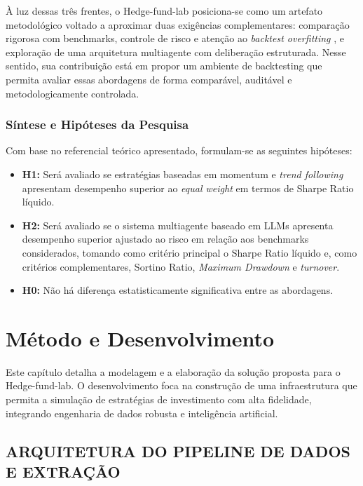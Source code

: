 \documentclass{eic-bcc-tcc}
\begin{document}
À luz dessas três frentes, o Hedge-fund-lab posiciona-se como um artefato metodológico voltado a aproximar duas exigências complementares: comparação rigorosa com benchmarks, controle de risco e atenção ao \textit{backtest overfitting} \citep{Bailey2014, LopezDePrado2018}, e exploração de uma arquitetura multiagente com deliberação estruturada. Nesse sentido, sua contribuição está em propor um ambiente de backtesting que permita avaliar essas abordagens de forma comparável, auditável e metodologicamente controlada.

\subsection{Síntese e Hipóteses da Pesquisa}

Com base no referencial teórico apresentado, formulam-se as seguintes hipóteses:

\begin{itemize}
\item \textbf{H1:} Será avaliado se estratégias baseadas em momentum e \textit{trend following} apresentam desempenho superior ao \textit{equal weight} em termos de Sharpe Ratio líquido.
\item \textbf{H2:} Será avaliado se o sistema multiagente baseado em LLMs apresenta desempenho superior ajustado ao risco em relação aos benchmarks considerados, tomando como critério principal o Sharpe Ratio líquido e, como critérios complementares, Sortino Ratio, \textit{Maximum Drawdown} e \textit{turnover}.
\item \textbf{H0:} Não há diferença estatisticamente significativa entre as abordagens.
\end{itemize}

\chapter{Método e Desenvolvimento}
\label{cha:metodo}

Este capítulo detalha a modelagem e a elaboração da solução proposta para o Hedge-fund-lab. O desenvolvimento foca na construção de uma infraestrutura que permita a simulação de estratégias de investimento com alta fidelidade, integrando engenharia de dados robusta e inteligência artificial.

\section{ARQUITETURA DO PIPELINE DE DADOS E EXTRAÇÃO}
\end{document}
